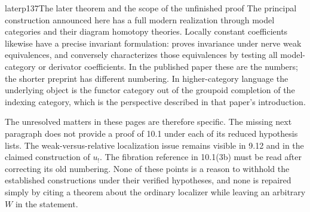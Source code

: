 \begin{dcomment}{later}{p137}{The later theorem and the scope of the unfinished proof}
The principal construction announced here has a full modern realization through model categories and their diagram homotopy theories. Locally constant coefficients likewise have a precise invariant formulation: \citet[Theorem 1.3 and Corollaries 1.28 and 3.8]{Cisinski2009LocallyConstant} proves invariance under nerve weak equivalences, and conversely characterizes those equivalences by testing all model-category or derivator coefficients. In the published paper these are the numbers; the shorter preprint has different numbering. In higher-category language the underlying object is the functor category out of the groupoid completion of the indexing category, which is the perspective described in that paper's introduction.

The unresolved matters in these pages are therefore specific. The missing next paragraph does not provide a proof of 10.1 under each of its reduced hypothesis lists. The weak-versus-relative localization issue remains visible in 9.12 and in the claimed construction of $u_!$. The fibration reference in 10.1(3b) must be read after correcting its old numbering. None of these points is a reason to withhold the established constructions under their verified hypotheses, and none is repaired simply by citing a theorem about the ordinary localizer while leaving an arbitrary $W$ in the statement.
\end{dcomment}
